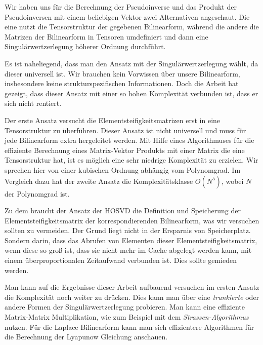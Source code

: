 Wir haben uns für die Berechnung der Pseudoinverse und das Produkt der Pseudoinversen mit einem beliebigen Vektor zwei Alternativen angeschaut. Die eine nutzt die Tensorstruktur der gegebenen Bilinearform, während die andere die Matrizen der Bilinearform in Tensoren umdefiniert und dann eine Singulärwertzerlegung höherer Ordnung durchführt.

Es ist naheliegend, dass man den Ansatz mit der Singulärwertzerlegung wählt, da dieser universell ist. Wir brauchen kein Vorwissen über unsere Bilinearform, insbesondere keine strukturspezifischen Informationen.
Doch die Arbeit hat gezeigt, dass dieser Ansatz mit einer so hohen Komplexität verbunden ist, dass er sich nicht rentiert.

Der erste Ansatz versucht die Elementsteifigkeitsmatrizen erst in eine Tensorstruktur zu überführen. Dieser Ansatz ist nicht universell und muss für jede Bilinearform extra hergeleitet werden. Mit Hilfe eines Algorithmuses für die effiziente Berechnung eines Matrix-Vektor Produkts mit einer Matrix die eine Tensorstruktur hat, ist es möglich eine sehr niedrige Komplexität zu erzielen. Wir sprechen hier von einer kubischen Ordnung abhängig vom Polynomgrad. Im Vergleich dazu hat der zweite Ansatz die Komplexitätsklasse $O(N^{5})$, wobei $N$ der Polynomgrad ist. 


Zu dem braucht der Ansatz der HOSVD die Definition und Speicherung der Elementsteifigkeitsmatrix der korrespondierenden Bilinearform, was wir versuchen sollten zu vermeiden. Der Grund liegt nicht in der Ersparnis von Speicherplatz. Sondern darin, dass das Abrufen von Elementen dieser Elementsteifigkeitsmatrix, wenn diese so groß ist, dass sie nicht mehr im Cache abgelegt werden kann, mit einem überproportionalen Zeitaufwand verbunden ist. Dies sollte gemieden werden.

Man kann auf die Ergebnisse dieser Arbeit aufbauend versuchen im ersten Ansatz die Komplexität noch weiter zu drücken. Dies kann man über eine \textit{trunkierte} oder andere Formen der Singulärwertzerlegung probieren. Man kann eine effiziente Matrix-Matrix Multiplikation, wie zum Beispiel mit dem \textit{Strassen-Algorithmus} nutzen. Für die Laplace Bilinearform kann man sich effizientere Algorithmen für die Berechnung der Lyapunow Gleichung anschauen.


